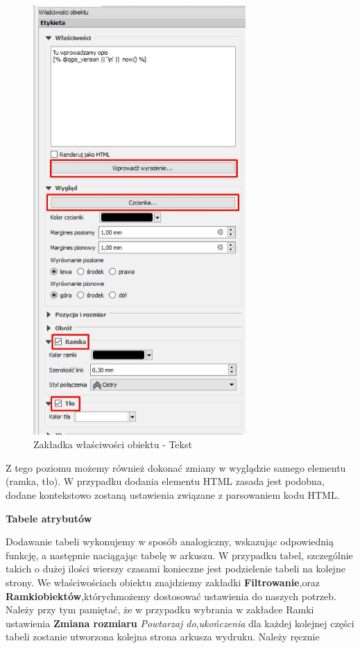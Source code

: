 \documentclass[12pt,a4paper]{book}
\begin{document}
\begin{center}
\begin{figure}
\includegraphics[width=8.096cm,height=16.369cm]{008-zakladka-tekst.png}
\caption{Zakładka właściwości obiektu - Tekst}
\end{figure}
\end{center}
Z tego poziomu możemy również dokonać zmiany w wyglądzie samego elementu (ramka, tło). W przypadku dodania elementu HTML zasada jest podobna, dodane kontekstowo zostaną ustawienia związane z parsowaniem kodu HTML.

{\bfseries
Tabele atrybutów}

Dodawanie tabeli wykonujemy w sposób analogiczny, wskazując odpowiednią funkcję, a następnie {\textquotedbl}naciągając{\textquotedbl} tabelę w arkuszu. W przypadku tabel, szczególnie takich o dużej ilości wierszy czasami konieczne jest podzielenie tabeli na kolejne strony. We właściwościach obiektu znajdziemy zakładki \textbf{Filtrowanie},oraz \textbf{Ramkiobiektów},którychmożemy dostosować ustawienia do naszych potrzeb. Należy przy tym pamiętać, że w przypadku wybrania w zakładce Ramki ustawienia \textbf{Zmiana rozmiaru }\textit{Powtarzaj do},\textit{ukończenia} dla każdej kolejnej części tabeli zostanie utworzona kolejna strona arkusza wydruku. Należy ręcznie
\end{document}
